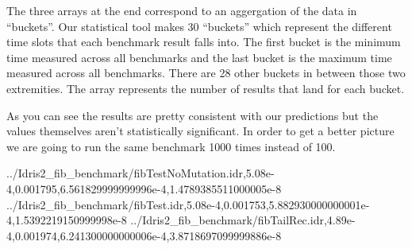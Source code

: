 \documentclass[
]{article}
\newenvironment{Shaded}{}{}
\newcommand{\DataTypeTok}[1]{\textcolor[rgb]{0.56,0.13,0.00}{#1}}
\newcommand{\FloatTok}[1]{\textcolor[rgb]{0.25,0.63,0.44}{#1}}
\newcommand{\NormalTok}[1]{#1}
\newcommand{\OperatorTok}[1]{\textcolor[rgb]{0.40,0.40,0.40}{#1}}
\begin{document}
The three arrays at the end correspond to an aggergation of the data in
``buckets''. Our statistical tool makes 30 ``buckets'' which represent
the different time slots that each benchmark result falls into. The
first bucket is the minimum time measured across all benchmarks and the
last bucket is the maximum time measured across all benchmarks. There
are 28 other buckets in between those two extremities. The array
represents the number of results that land for each bucket.

As you can see the results are pretty consistent with our predictions
but the values themselves aren't statistically significant. In order to
get a better picture we are going to run the same benchmark 1000 times
instead of 100.

\begin{Shaded}
\begin{Highlighting}[]
\OperatorTok{../}\DataTypeTok{Idris2\_fib\_benchmark}\OperatorTok{/}\NormalTok{fibTestNoMutation}\OperatorTok{.}\NormalTok{idr,}\FloatTok{5.08e{-}4}\NormalTok{,}\FloatTok{0.001795}\NormalTok{,}\FloatTok{6.561829999999996e{-}4}\NormalTok{,}\FloatTok{1.4789385511000005e{-}8}
\OperatorTok{../}\DataTypeTok{Idris2\_fib\_benchmark}\OperatorTok{/}\NormalTok{fibTest}\OperatorTok{.}\NormalTok{idr,}\FloatTok{5.08e{-}4}\NormalTok{,}\FloatTok{0.001753}\NormalTok{,}\FloatTok{5.882930000000001e{-}4}\NormalTok{,}\FloatTok{1.5392219150999998e{-}8}
\OperatorTok{../}\DataTypeTok{Idris2\_fib\_benchmark}\OperatorTok{/}\NormalTok{fibTailRec}\OperatorTok{.}\NormalTok{idr,}\FloatTok{4.89e{-}4}\NormalTok{,}\FloatTok{0.001974}\NormalTok{,}\FloatTok{6.241300000000006e{-}4}\NormalTok{,}\FloatTok{3.8718697099999886e{-}8}


\end{Highlighting}
\end{Shaded}
\end{document}
